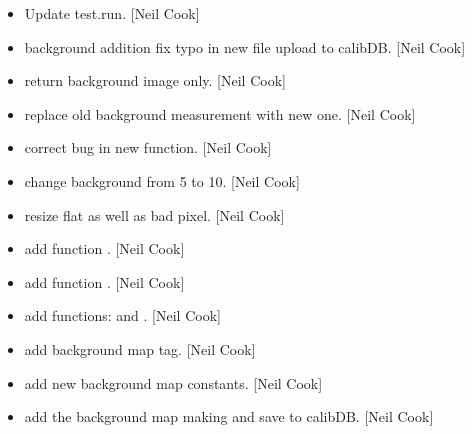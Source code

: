 \documentclass[a4paper,10pt,english]{report}
\begin{document}
\begin{itemize}
\item {} 
Update test.run. {[}Neil Cook{]}

\item {} 
 \sphinxhyphen{} background addition \sphinxhyphen{} fix typo in new file
upload to calibDB. {[}Neil Cook{]}

\item {} 
 \sphinxhyphen{} return background image only. {[}Neil Cook{]}

\item {} 
 \sphinxhyphen{} replace old background measurement
with new one. {[}Neil Cook{]}

\item {} 
 \sphinxhyphen{} correct bug in new function. {[}Neil Cook{]}

\item {} 
 \sphinxhyphen{} change background from 5 to 10. {[}Neil Cook{]}

\item {} 
 \sphinxhyphen{} resize flat as well as bad pixel. {[}Neil Cook{]}

\item {} 
 \sphinxhyphen{} add function . {[}Neil Cook{]}

\item {} 
 \sphinxhyphen{} add function . {[}Neil Cook{]}

\item {} 
 \sphinxhyphen{} add functions:  and
. {[}Neil Cook{]}

\item {} 
 \sphinxhyphen{} add background map tag. {[}Neil Cook{]}

\item {} 
 \sphinxhyphen{} add new background map constants. {[}Neil
Cook{]}

\item {} 
 \sphinxhyphen{} add the background map making and save to
calibDB. {[}Neil Cook{]}


\end{itemize}
\end{document}
